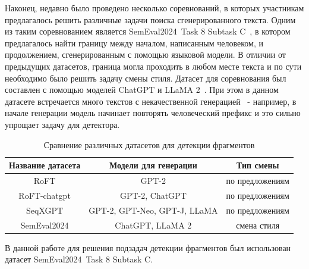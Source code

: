 Наконец, недавно было проведено несколько соревнований, в которых участникам предлагалось решить различные задачи поиска сгенерированного текста. Одним из таким соревнованием является SemEval2024~Task 8 Subtask C~\cite{semeval2024task8}, в котором предлагалось найти границу между началом, написанным человеком, и продолжением, сгенерированным с помощью языковой модели. В отличии от предыдущих датасетов, граница могла проходить в любом месте текста и по сути необходимо было решить задачу смены стиля. Датасет для соревнования был составлен с помощью моделей ChatGPT и LLaMA 2~\cite{touvron2023llama}. При этом в данном датасете встречается много текстов с некачественной генерацией~\cite{voznyuk2024deeppavlov} - например, в начале генерации модель начинает повторять человеческий префикс и это сильно упрощает задачу для детектора.


\begin{table}[ht]
    \centering
    \begin{tabular}{|c|c|c|}
        \hline
        Название датасета & Модели для генерации & Тип смены \\
        \hline
        RoFT & GPT-2 & по предложениям \\
        RoFT-chatgpt & GPT-2, ChatGPT & по предложениям \\
        SeqXGPT & GPT-2, GPT-Neo, GPT-J, LLaMA & по предложениям  \\
        SemEval2024 & ChatGPT, LLaMA 2 & смена стиля  \\
        \hline
    \end{tabular}
    \caption{Сравнение различных датасетов для детекции фрагментов}
    \label{tab:my_label}
\end{table}

В данной работе для решения подзадач детекции фрагментов был использован датасет SemEval2024~Task 8 Subtask C.

